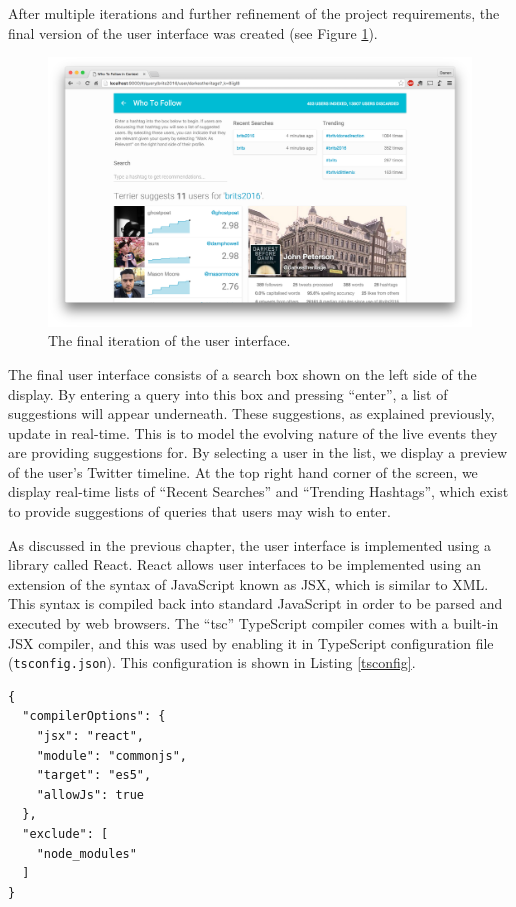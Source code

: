 \documentclass{l4proj}
\newcommand{\code}[1]{\texttt{#1}}
\begin{document}
After multiple iterations and further refinement of the project requirements, the final version of the user interface was created (see Figure \ref{finalscreenshot}).
        
\begin{figure}[H]
\centering
\includegraphics[scale=0.17]{finalscreenshot.png}
\caption{The final iteration of the user interface.}
\label{finalscreenshot}
\end{figure}

The final user interface consists of a search box shown on the left side of the display. By entering a query into this box and pressing ``enter'', a list of suggestions will appear underneath. These suggestions, as explained previously, update in real-time. This is to model the evolving nature of the live events they are providing suggestions for. By selecting a user in the list, we display a preview of the user's Twitter timeline. At the top right hand corner of the screen, we display real-time lists of ``Recent Searches'' and ``Trending Hashtags'', which exist to provide suggestions of queries that users may wish to enter.

    As discussed in the previous chapter, the user interface is implemented using a library called React. React allows user interfaces to be implemented using an extension of the syntax of JavaScript known as JSX, which is similar to XML. This syntax is compiled back into standard JavaScript in order to be parsed and executed by web browsers. The ``tsc'' TypeScript compiler comes with a built-in JSX compiler, and this was used by enabling it in TypeScript configuration file (\code{tsconfig.json}). This configuration is shown in Listing \ref{tsconfig}.
    
\begin{lstlisting}[label=tsconfig,caption=TypeScript compiler configuration.]
{
  "compilerOptions": {
    "jsx": "react",
    "module": "commonjs",
    "target": "es5",
    "allowJs": true
  },
  "exclude": [
    "node_modules"
  ]
}
\end{lstlisting}
\end{document}
